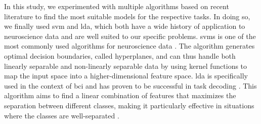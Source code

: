 In this study, we experimented with multiple algorithms based on recent literature to find the most suitable models for the respective tasks. In doing so, we finally used \gls{svm} and \gls{lda}, which both have a wide history of application to neuroscience data and are well suited to our specific problems.  \Glspl{svm} is one of the most commonly used algorithms for neuroscience data \cite{VAROQUAUX2017166}. The algorithm generates optimal decision boundaries, called hyperplanes, and can thus handle both linearly separable and non-linearly separable data by using kernel functions to map the input space into a higher-dimensional feature space. \Gls{lda} is specifically used in the context of \Gls{bci} and has proven to be successful in task decoding \cite{Blankertz2008}. This algorithm aims to find a linear combination of features that maximizes the separation between different classes, making it particularly effective in situations where the classes are well-separated \cite{shoorangiz2021eeg}. 



